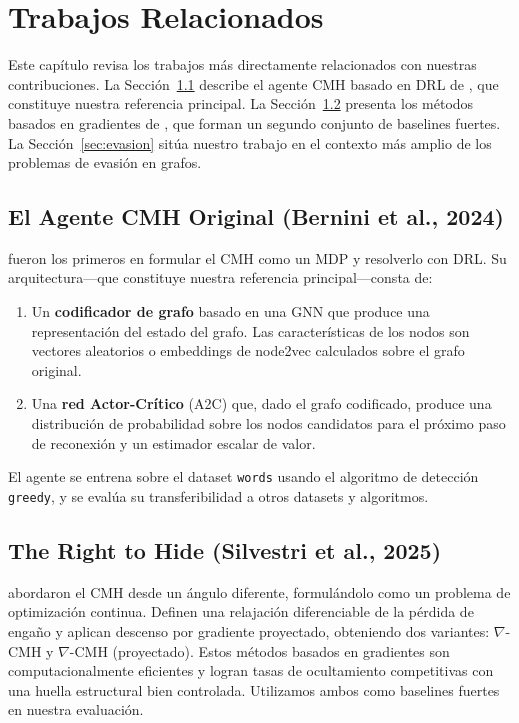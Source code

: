 \documentclass[11pt,a4paper,twoside]{tesis}
\begin{document}
\chapter{Trabajos Relacionados}
\label{ch:related}

Este capítulo revisa los trabajos más directamente relacionados con nuestras
contribuciones. La Sección~\ref{sec:bernini} describe el agente CMH basado en DRL de
\textcite{bernini-2024}, que constituye nuestra referencia principal. La
Sección~\ref{sec:nabla} presenta los métodos basados en gradientes de
\textcite{silvestri2025righthidemaskingcommunity}, que forman un segundo conjunto de
baselines fuertes. La Sección~\ref{sec:evasion} sitúa nuestro trabajo en el contexto
más amplio de los problemas de evasión en grafos.

\section{El Agente CMH Original (Bernini et al., 2024)}
\label{sec:bernini}

\textcite{bernini-2024} fueron los primeros en formular el CMH como un MDP y resolverlo
con DRL. Su arquitectura---que constituye nuestra referencia principal---consta de:
\begin{enumerate}
    \item Un \textbf{codificador de grafo} basado en una GNN que produce una
          representación del estado del grafo. Las características de los nodos son
          vectores aleatorios o embeddings de node2vec calculados sobre el grafo original.
    \item Una \textbf{red Actor-Crítico} (A2C) que, dado el grafo codificado, produce
          una distribución de probabilidad sobre los nodos candidatos para el próximo paso
          de reconexión y un estimador escalar de valor.
\end{enumerate}
El agente se entrena sobre el dataset \texttt{words} usando el algoritmo de detección
\texttt{greedy}, y se evalúa su transferibilidad a otros datasets y algoritmos.

\section{The Right to Hide (Silvestri et al., 2025)}
\label{sec:nabla}

\textcite{silvestri2025righthidemaskingcommunity} abordaron el CMH desde un ángulo
diferente, formulándolo como un problema de optimización continua. Definen una relajación
diferenciable de la pérdida de engaño y aplican descenso por gradiente proyectado,
obteniendo dos variantes: $\nabla$-CMH y $\nabla$-CMH (proyectado). Estos métodos
basados en gradientes son computacionalmente eficientes y logran tasas de ocultamiento
competitivas con una huella estructural bien controlada. Utilizamos ambos como
baselines fuertes en nuestra evaluación.
\end{document}
